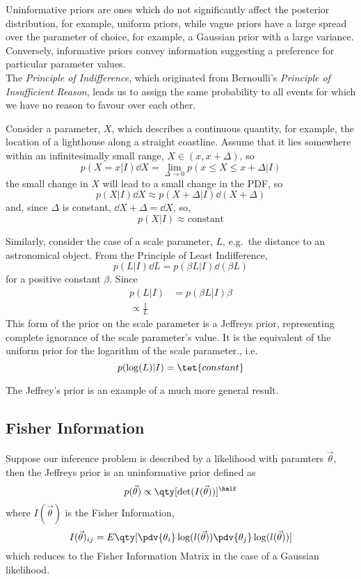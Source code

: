 \documentclass{dwnotes}         		        %
\begin{document}
Uninformative priors are ones which do not significantly affect the
posterior distribution, for example, uniform priors, while vague
priors have a large spread over the parameter of choice, for example,
a Gaussian prior with a large variance. Conversely, informative priors
convey information suggesting a preference for particular parameter
values.\\
The \emph{Principle of Indifference}, which originated from
Bernoulli's \emph{Principle of Insufficient Reason}, leads us to
assign the same probability to all events for which we have no reason
to favour over each other.

Consider a parameter, $X$, which describes a continuous quantity, for
example, the location of a lighthouse along a straight
coastline. Assume that it lies somewhere within an infinitesimally
small range, $X \in (x, x+\Delta)$, so
\[ p(X=x|I) \dd{X} = \lim_{\Delta \to 0} p(x \le X \le x+\Delta | I) \]
the small change in $X$ will lead to a small change in the PDF, so
\[ p(X|I)\dd{X} \approx p(X+\Delta|I) \dd{(X+\Delta)} \]
and, since $\Delta$ is constant, $\dd{X+\Delta} = \dd{X}$, so,
\[ p(X|I) \approx \text{constant} \]

Similarly, consider the case of a scale parameter, $L$, e.g.\ the
distance to an astronomical object. From the Principle of Least
Indifference,
\[ p(L|I) \dd{L} = p(\beta L |I) \dd{(\beta L)} \] for a positive
constant $\beta$. Since 
\begin{align*}
  p(L|I) &= p(\beta L|I)\beta \\ \propto \frac{1}{L}
\end{align*}
This form of the prior on the scale parameter is a Jeffreys prior,
representing complete ignorance of the scale parameter's value. It is
the equivalent of the uniform prior for the logarithm of the scale
parameter., i.e.\
\[ p(\log(L) | I) = \tet{constant} \]

The Jeffrey's prior is an example of a much more general result.

\subsection{Fisher Information}
\label{sec:fisher-information}

Suppose our inference problem is described by a likelihood with
paramters $\vec{\theta}$, then the Jeffreys prior is an uninformative
prior defined as
\[ p(\vec{\theta}) \propto \qty[ \det(I(\vec{\theta})) ]^{\half} \]
where $I(\vec{\theta})$ is the Fisher Information,
\begin{equation}
  \label{eq:11}
  I(\vec{\theta})_{ij} = E \qty[ \pdv{\theta_i} \log(l(\vec{\theta})) \pdv{\theta_j} \log(l(\vec{\theta}))]
\end{equation}
which reduces to the Fisher Information Matrix in the case of a
Gaussian likelihood.
\end{document}
